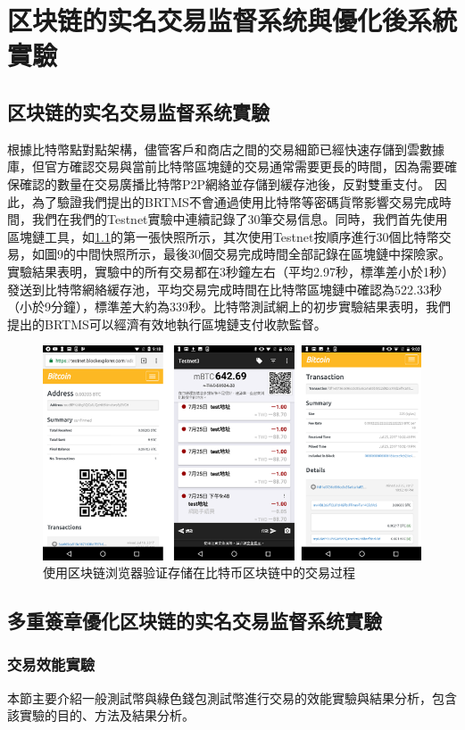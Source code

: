 
\chapter{区块链的实名交易监督系统與優化後系統實驗}
	\section{区块链的实名交易监督系统實驗}
	根據比特幣點對點架構，儘管客戶和商店之間的交易細節已經快速存儲到雲數據庫，但官方確認交易與當前比特幣區塊鏈的交易通常需要更長的時間，因為需要確保確認的數量在交易廣播比特幣P2P網絡並存儲到緩存池後，反對雙重支付。
	因此，為了驗證我們提出的BRTMS不會通過使用比特幣等密碼貨幣影響交易完成時間，我們在我們的Testnet實驗中連續記錄了30筆交易信息。同時，我們首先使用區塊鏈工具，如\ref{fig9}的第一張快照所示，其次使用Testnet按順序進行30個比特幣交易，如圖9的中間快照所示，最後30個交易完成時間全部記錄在區塊鏈中探險家。實驗結果表明，實驗中的所有交易都在3秒鐘左右（平均2.97秒，標準差小於1秒）發送到比特幣網絡緩存池，平均交易完成時間在比特幣區塊鏈中確認為522.33秒（小於9分鐘），標準差大約為339秒。比特幣測試網上的初步實驗結果表明，我們提出的BRTMS可以經濟有效地執行區塊鏈支付收款監督。

	\begin{figure}[h]
		\centering
		\includegraphics[width = 1\textwidth]{fig9.png}
		\caption{使用区块链浏览器验证存储在比特币区块链中的交易过程}\label{fig9}
	\end{figure}

	\section{多重簽章優化区块链的实名交易监督系统實驗}
		\subsection{交易效能實驗}
		本節主要介紹一般測試幣與綠色錢包測試幣進行交易的效能實驗與結果分析，包含該實驗的目的、方法及結果分析。

